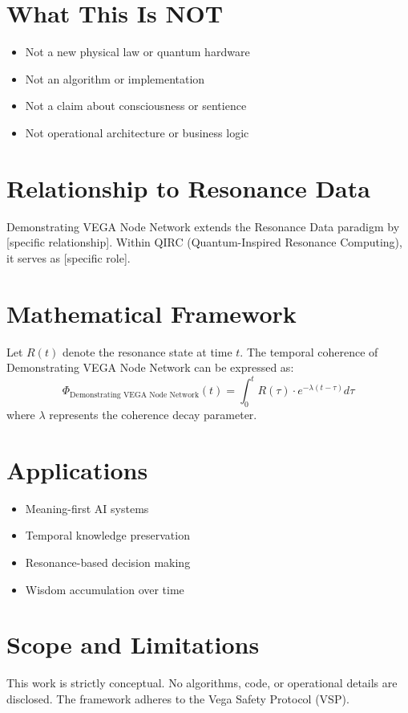 \documentclass[12pt,a4paper]{article}
\begin{document}
\section{What This Is NOT}
\begin{itemize}
\item Not a new physical law or quantum hardware
\item Not an algorithm or implementation
\item Not a claim about consciousness or sentience
\item Not operational architecture or business logic
\end{itemize}

\section{Relationship to Resonance Data}
Demonstrating VEGA Node Network extends the Resonance Data paradigm by [specific relationship].
Within QIRC (Quantum-Inspired Resonance Computing), it serves as [specific role].

\section{Mathematical Framework}
Let $R(t)$ denote the resonance state at time $t$. The temporal coherence of Demonstrating VEGA Node Network 
can be expressed as:
\[
\Phi_{\text{Demonstrating VEGA Node Network}}(t) = \int_0^t R(\tau) \cdot e^{-\lambda(t-\tau)} d\tau
\]
where $\lambda$ represents the coherence decay parameter.

\section{Applications}
\begin{itemize}
\item Meaning-first AI systems
\item Temporal knowledge preservation
\item Resonance-based decision making
\item Wisdom accumulation over time
\end{itemize}

\section{Scope and Limitations}
This work is strictly conceptual. No algorithms, code, or operational details are disclosed.
The framework adheres to the Vega Safety Protocol (VSP).
\end{document}
